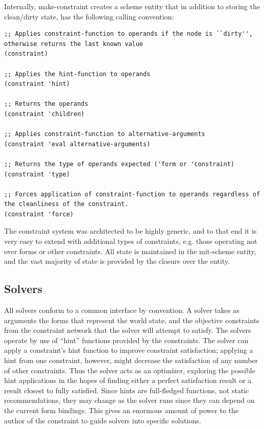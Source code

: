 \documentclass[12pt,a4paper]{article}
\begin{document}
Internally, make-constraint creates a scheme entity that in addition to storing the clean/dirty state, has the following calling convention:
\begin{lstlisting}
;; Applies constraint-function to operands if the node is ``dirty'', otherwise returns the last known value
(constraint)

;; Applies the hint-function to operands
(constraint 'hint)

;; Returns the operands
(constraint 'children)

;; Applies constraint-function to alternative-arguments
(constraint 'eval alternative-arguments)

;; Returns the type of operands expected ('form or 'constraint)
(constraint 'type) 

;; Forces application of constraint-function to operands regardless of the cleanliness of the constraint.
(constraint 'force)

\end{lstlisting}
The constraint system was architected to be highly generic, and to that end it is very easy to extend with additional types of constraints, e.g. those operating not over forms or other constraints.   All state is maintained in the mit-scheme entity, and the vast majority of state is provided by the closure over the entity.

\subsection{Solvers}

All solvers conform to a common interface by convention. A solver takes as arguments the forms that represent the world state, and the objective constraints from the constraint network that the solver will attempt to satisfy. The solvers operate by use of ``hint'' functions provided by the constraints. The solver can apply a constraint's hint function to improve constraint satisfaction; applying a hint from one constraint, however, might decrease the satisfaction of any number of other constraints. Thus the solver acts as an optimizer, exploring the possible hint applications in the hopes of finding either a perfect satisfaction result or a result closest to fully satisfied. Since hints are full-fledged functions, not static recommendations, they may change as the solver runs since they can depend on the current form bindings. This gives an enormous amount of power to the author of the constraint to guide solvers into specific solutions.
\end{document}
